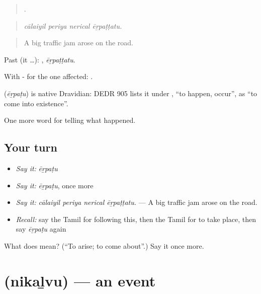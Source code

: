 \begin{quote}
   .
\end{quote}

\begin{quote}
\emph{cālaiyil periya nerical ēṟpaṭṭatu.}
\end{quote}

\begin{quote}
A big traffic jam arose on the road.
\end{quote}

Past (it …): , \emph{ēṟpaṭṭatu}.

With - for the one affected:   .

\begin{cousinweb}
\textbf{} (\emph{ēṟpaṭu}) is native Dravidian: DEDR 905 lists it under , \textquotedblleft{}to happen, occur\textquotedblright{}, as \textquotedblleft{}to come into existence\textquotedblright{}.
\end{cousinweb}

\begin{grammarlens}[title={What you've built}]
One more word for telling what happened.
\end{grammarlens}

\subsection*{Your turn}
\begin{itemize}
\raggedright
  \item \emph{Say it:} \emph{ēṟpaṭu}
  \item \emph{Say it:} \emph{ēṟpaṭu}, once more
  \item \emph{Say it:} \emph{cālaiyil periya nerical ēṟpaṭṭatu.} — A big traffic jam arose on the road.
  \item \emph{Recall:} say the Tamil for following this, then the Tamil for to take place, then say \emph{ēṟpaṭu} again
\end{itemize}

\begin{tcolorbox}[breakable,colback=teal!4,colframe=teal!35!black,title={Before you move on}]
What does  mean? (\textquotedblleft{}To arise; to come about\textquotedblright{}.) Say it once more.
\end{tcolorbox}
\section[\texorpdfstring{\ta{நிகழ்வு} (nikaḻvu)}{நிகழ்வு (nikaḻvu)}]{ (nikaḻvu) — an event}


